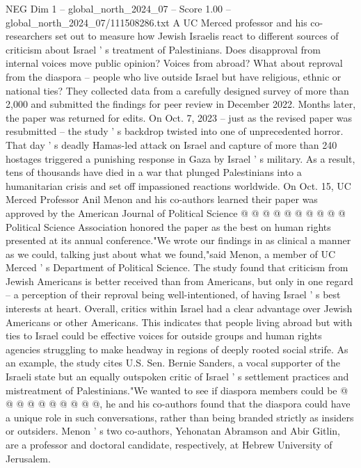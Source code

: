 \begin{textsample}{NEG Dim 1 – global\_north\_2024\_07 – Score 1.00 – global\_north\_2024\_07/111508286.txt}  \label{ex:f1_neg_274}
A UC Merced professor and his co-researchers set out to measure how Jewish Israelis react to different sources of criticism about Israel ' s treatment of Palestinians.
Does disapproval from internal voices move public opinion?
Voices from abroad?
What about reproval from the diaspora -- people who live outside Israel but have religious, ethnic or national ties?
They collected data from a carefully designed survey of more than 2,000 and submitted the findings for peer review in December 2022.
Months later, the paper was returned for edits.
On Oct. 7, 2023 -- just as the revised paper was resubmitted -- the study ' s backdrop twisted into one of unprecedented horror.
That day ' s deadly Hamas-led attack on Israel and capture of more than 240 hostages triggered a punishing response in Gaza by Israel ' s military.
As a result, tens of thousands have died in a war that plunged Palestinians into a humanitarian crisis and set off impassioned reactions worldwide.
On Oct. 15, UC Merced Professor Anil Menon and his co-authors learned their paper was approved by the American Journal of Political Science @ @ @ @ @ @ @ @ @ @ Political Science Association honored the paper as the best on human rights presented at its annual conference."We wrote our findings in as clinical a manner as we could, talking just about what we found,"said Menon, a member of UC Merced ' s Department of Political Science.
The study found that criticism from Jewish Americans is better received than from Americans, but only in one regard -- a perception of their reproval being well-intentioned, of having Israel ' s best interests at heart.
Overall, critics within Israel had a clear advantage over Jewish Americans or other Americans.
This indicates that people living abroad but with ties to Israel could be effective voices for outside groups and human rights agencies struggling to make headway in regions of deeply rooted social strife.
As an example, the study cites U.S.
Sen.
Bernie Sanders, a vocal supporter of the Israeli state but an equally outspoken critic of Israel ' s settlement practices and mistreatment of Palestinians."We wanted to see if diaspora members could be @ @ @ @ @ @ @ @ @ @, he and his co-authors found that the diaspora could have a unique role in such conversations, rather than being branded strictly as insiders or outsiders.
Menon ' s two co-authors, Yehonatan Abramson and Abir Gitlin, are a professor and doctoral candidate, respectively, at Hebrew University of Jerusalem.

\end{textsample}
